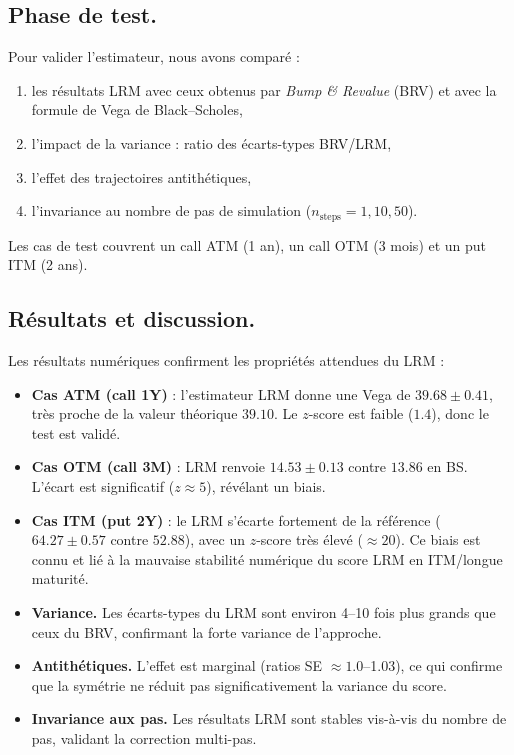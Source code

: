 \documentclass[a4paper,11pt]{article}
\begin{document}
\subsection*{Phase de test.}  
Pour valider l’estimateur, nous avons comparé :
\begin{enumerate}
  \item les résultats LRM avec ceux obtenus par \emph{Bump \& Revalue} (BRV) et avec la formule de Vega de Black–Scholes,
  \item l’impact de la variance : ratio des écarts-types BRV/LRM,
  \item l’effet des trajectoires antithétiques,
  \item l’invariance au nombre de pas de simulation ($n_{\text{steps}}=1,10,50$).
\end{enumerate}
Les cas de test couvrent un call ATM (1 an), un call OTM (3 mois) et un put ITM (2 ans).

\subsection*{Résultats et discussion.}  
Les résultats numériques confirment les propriétés attendues du LRM :
\begin{itemize}
  \item \textbf{Cas ATM (call 1Y)} : l’estimateur LRM donne une Vega de $39.68 \pm 0.41$, très proche de la valeur théorique $39.10$. Le $z$-score est faible ($1.4$), donc le test est validé.
  \item \textbf{Cas OTM (call 3M)} : LRM renvoie $14.53 \pm 0.13$ contre $13.86$ en BS. L’écart est significatif ($z \approx 5$), révélant un biais. 
  \item \textbf{Cas ITM (put 2Y)} : le LRM s’écarte fortement de la référence ($64.27 \pm 0.57$ contre $52.88$), avec un $z$-score très élevé ($\approx 20$). Ce biais est connu et lié à la mauvaise stabilité numérique du score LRM en ITM/longue maturité.
  \item \textbf{Variance.} Les écarts-types du LRM sont environ 4–10 fois plus grands que ceux du BRV, confirmant la forte variance de l’approche.
  \item \textbf{Antithétiques.} L’effet est marginal (ratios SE $\approx 1.0$–1.03), ce qui confirme que la symétrie ne réduit pas significativement la variance du score.
  \item \textbf{Invariance aux pas.} Les résultats LRM sont stables vis-à-vis du nombre de pas, validant la correction multi-pas.
\end{itemize}
\end{document}
